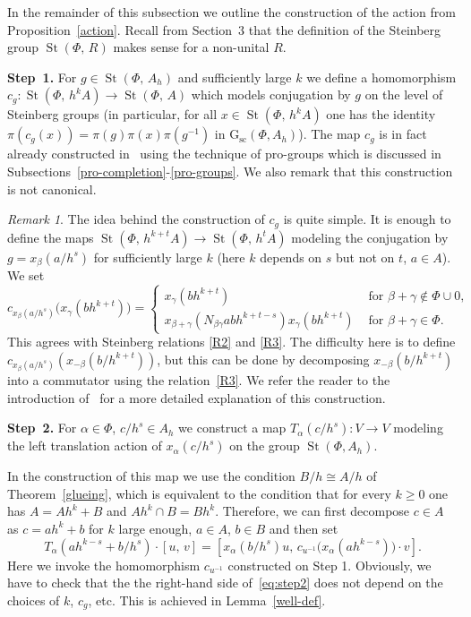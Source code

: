 \documentclass[oneside, 11pt]{amsart}
\numberwithin{equation}{section}
\newcommand{\St}{\mathop{\mathrm{St}}\nolimits}
\theoremstyle{definition}
\theoremstyle{definition}
\theoremstyle{remark}
\newtheorem{rem}[lemma]{Remark}
\begin{document}
In the remainder of this subsection we outline the construction of the action from Proposition~\ref{action}. Recall from Section~3 that the definition of the Steinberg group $\St(\Phi,\,R)$ makes sense for a non-unital $R$.

{\bf Step~1.} For $g\in\St(\Phi,\,A_h)$ and sufficiently large $k$ we define a homomorphism $c_{g}\colon\St(\Phi,\,h^kA)\rightarrow\St(\Phi,\,A)$ which models conjugation by $g$ on the level of Steinberg groups (in particular, for all $x\in \St(\Phi,\, h^kA)$ one has the identity $\pi(c_g(x)) = \pi(g) \pi(x) \pi(g^{-1})$ in $\mathrm{G}_{\mathrm{sc}}(\Phi, A_h)$). 
The map $c_g$ is in fact already constructed in~\cite{LSV20} using the technique of pro-groups which is discussed in Subsections~\ref{pro-completion}-\ref{pro-groups}. We also remark that this construction is not canonical.


\begin{rem}
The idea behind the construction of $c_g$ is quite simple. It is enough to define the maps $\St(\Phi,\,h^{k+t}A)\rightarrow\St(\Phi,\,h^tA)$ modeling the conjugation by $g=x_\beta(a/h^s)$ for sufficiently large $k$ (here $k$ depends on $s$ but not on $t$, $a\in A$). We set
$$
c_{x_\beta(a/h^s)}\big(x_\gamma(bh^{k+t})\big)=
\begin{cases}
x_{\gamma}(bh^{k+t})&\text{  for }\beta+\gamma\not\in\Phi\cup0,\\
x_{\beta+\gamma}(N_{\beta\gamma}abh^{k+t-s})x_{\gamma}(bh^{k+t})&\text{ for }\beta+\gamma\in\Phi.
\end{cases}
$$
This agrees with Steinberg relations \eqref{R2} and \eqref{R3}. The difficulty here is to define  $c_{x_\beta(a/h^s)}(x_{-\beta}(b/h^{k+t}))$, but this can be done by decomposing $x_{-\beta}(b/h^{k+t})$ into a commutator using the relation~\eqref{R3}. We refer the reader to the introduction of~\cite{LSV20} for a more detailed explanation of this construction.
\end{rem}

{\bf Step~2.} For $\alpha\in\Phi$, $c/h^s\in A_h$ we construct a map $T_\alpha(c/h^s)\colon V\rightarrow V$ modeling the left translation action of $x_\alpha(c/h^s)$ on the group $\St(\Phi, A_h)$.

In the construction of this map we use the condition $B/h\cong A/h$ of Theorem~\ref{glueing}, which is equivalent to the condition that for every $k\geq0$ one has $A = Ah^k + B$ and $Ah^k\cap B = Bh^k$. Therefore, we can first decompose $c\in A$ as $c=ah^k+b$ for $k$ large enough, $a\in A$, $b\in B$ and then set
\begin{equation}\label{eq:step2}
T_\alpha(ah^{k-s}+b/h^s)\cdot[u,\,v]=[x_\alpha(b/h^s)u,\,c_{u^{-1}}\big(x_\alpha(ah^{k-s})\big)\cdot v].
\end{equation}
Here we invoke the homomorphism $c_{u^{-1}}$ constructed on Step 1. Obviously, we have to check that the the right-hand side of~\eqref{eq:step2} does not depend on the choices of $k$, $c_g$, etc. This is achieved in Lemma~\ref{well-def}.
\end{document}
